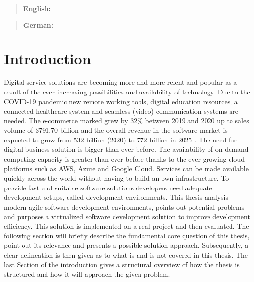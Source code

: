 \documentclass[12pt, a4paper]{article}
\begin{document}



\maketitle
\begin{abstract}
    \textbf{English:} \lipsum[20]
\end{abstract}
\begin{abstract}
    \textbf{German:} \lipsum[20]
\end{abstract}
\newpage

\tableofcontents
\newpage

\setcounter{lastroman}{\value{page}}


\section{Introduction}\label{sec::intro}
Digital service solutions are becoming more and more relent and popular as a result of the ever-increasing possibilities and availability of technology. Due to the COVID-19 pandemic new remote working tools, digital education resources, a connected healthcare system and seamless (video) communication systems are needed. The e-commerce marked grew by 32\% between 2019 and 2020 up to sales volume of \$791.70 billion \cite{online_shopping_inc} and the overall revenue in the software market is expected to grow from 532 billion (2020) to 772 billion in 2025 \cite{software_industry_groth}. The need for digital business solution is bigger than ever before. The availability of on-demand computing capacity is greater than ever before thanks to the ever-growing cloud platforms such as \ac{AWS}, Azure and Google Cloud. Services can be made available quickly across the world without having to build an own infrastructure. To provide fast and suitable software solutions developers need adequate development setups, called development environments. This thesis analysis modern agile software development environments, points out potential problems and purposes a virtualized software development solution to improve development efficiency. This solution is implemented on a real project and then evaluated.\newline
The following section will briefly describe the fundamental core question of this thesis, point out its relevance and presents a possible solution approach. Subsequently, a clear delineation is then given as to what is and is not covered in this thesis. The last Section of the introduction gives a structural overview of how the thesis is structured and how it will approach the given problem.
\end{document}
